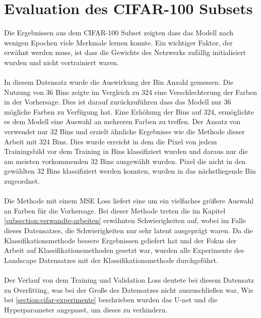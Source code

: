 \section{Evaluation des CIFAR-100 Subsets}
Die Ergebnissen aus dem CIFAR-100 Subset zeigten dass das Modell nach wenigen Epochen viele Merkmale lernen konnte. Ein wichtiger Faktor, der 
erwähnt werden muss, ist dass die Gewichte des Netzwerks zufällig initialisiert wurden und nicht vortrainiert waren. 
\\
\\
In diesem Datensatz wurde die Auswirkung der Bin Anzahl gemessen. Die Nutzung von 36 Bins zeigte im Vergleich zu 324 eine 
Verschlechterung der Farben in der Vorhersage. Dies ist darauf zurückzuführen dass das Modell nur 36 mögliche Farben zu Verfügung hat.
Eine Erhöhung der Bins auf 324, ermöglichte es dem Modell eine Auswahl an mehreren Farben zu treffen. 
Der Ansatz von \cite{billaut2018colorunet} verwendet nur 32 Bins und erzielt ähnliche Ergebnisse wie die Methode dieser Arbeit mit 324 Bins.
Dies wurde erreicht in dem die Pixel von jedem Trainingsbild vor dem Training in Bins klassifiziert wurden und daraus nur die am meisten
vorkommenden 32 Bins ausgewählt wurden. Pixel die nicht in den gewählten 32 Bins klassifiziert werden konnten, wurden in das nächstliegende Bin
zugeordnet.
\\
\\
Die Methode mit einem MSE Loss liefert eine um ein vielfaches größere Auswahl an Farben für die Vorhersage. Bei dieser Methode treten 
die im Kapitel \ref{subsection:verwandte-arbeiten} erwähnten Schwierigkeiten auf, wobei im Falle dieses Datensatzes, die Schwierigkeiten
nur sehr latent ausgeprägt waren.
Da die Klassifikationsmethode bessere Ergebnissen geliefert hat und der Fokus der Arbeit auf Klassifikationsmethoden gesetzt war,
wurden alle Experimente des Landscape Datensatzes mit der Klassifikationsmethode durchgeführt.
\\
\\
Der Verlauf von dem Training und Validation Loss deutete bei diesem Datensatz zu Overfitting, was bei der Große des Datensatzes nicht auszuschließen war.
Wie bei \ref{section:cifar-experimente} beschrieben wurden das U-net und die Hyperparameter angepasst, um dieses zu verhindern.

